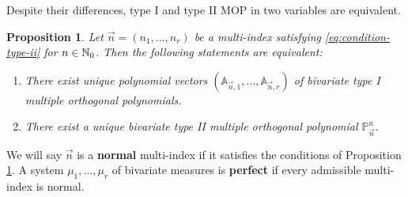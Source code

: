 \documentclass[portrait,final,a0paper,fontscale=0.38]{baposter}
\newtheorem{proposition}{Proposition}
\begin{document}
\begin{poster}
{\begin{multicols}{2}
Despite their differences, type I and type II MOP in two variables are equivalent.
\begin{proposition}
  \label{prop:existence}
  Let $\vec n = (n_1,\dots,n_r)$ be a multi-index satisfying \eqref{eq:condition-type-ii} for $n\in\mathbb{N}_0$. Then the following statements are equivalent:
  \begin{enumerate}
      \item There exist unique polynomial vectors $(\mathbb A_{\vec n,1}, \dots, \mathbb A_{\vec n,r})$ of bivariate type I multiple orthogonal polynomials.
      \item There exist a unique bivariate type II multiple orthogonal polynomial $\mathbb P_{\vec n}^n$.
  \end{enumerate}
\end{proposition}
We will say $\vec n$ is a \textbf{normal} multi-index if it satisfies the conditions of Proposition \ref{prop:existence}. A system $\mu_1,\dots,\mu_r$ of bivariate measures is \textbf{perfect} if every admissible multi-index is normal.

\end{multicols}
}
%
{

}
\end{poster}
\end{document}
